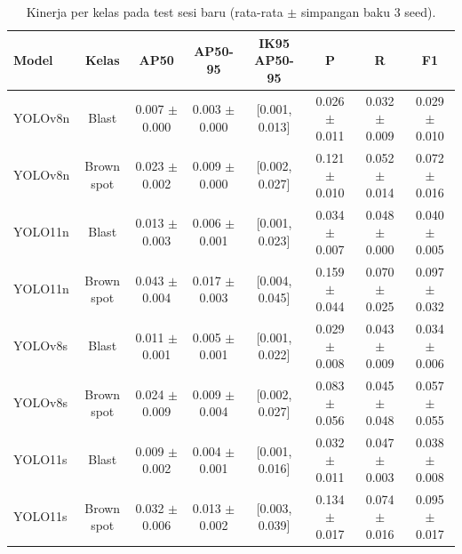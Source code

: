 \begin{table}[!t]
\centering
\caption{Kinerja per kelas pada test sesi baru (rata-rata $\pm$ simpangan baku 3 seed).}
\label{tab:per_kelas_sesi_baru}
\footnotesize
\begin{tabular}{lccccccc}
\hline
\textbf{Model} & \textbf{Kelas} & \textbf{AP50} & \textbf{AP50-95} & \textbf{IK95 AP50-95} & \textbf{P} & \textbf{R} & \textbf{F1} \\
\hline
YOLOv8n & Blast & 0.007 $\pm$ 0.000 & 0.003 $\pm$ 0.000 & [0.001, 0.013] & 0.026 $\pm$ 0.011 & 0.032 $\pm$ 0.009 & 0.029 $\pm$ 0.010 \\
YOLOv8n & Brown spot & 0.023 $\pm$ 0.002 & 0.009 $\pm$ 0.000 & [0.002, 0.027] & 0.121 $\pm$ 0.010 & 0.052 $\pm$ 0.014 & 0.072 $\pm$ 0.016 \\
YOLO11n & Blast & 0.013 $\pm$ 0.003 & 0.006 $\pm$ 0.001 & [0.001, 0.023] & 0.034 $\pm$ 0.007 & 0.048 $\pm$ 0.000 & 0.040 $\pm$ 0.005 \\
YOLO11n & Brown spot & 0.043 $\pm$ 0.004 & 0.017 $\pm$ 0.003 & [0.004, 0.045] & 0.159 $\pm$ 0.044 & 0.070 $\pm$ 0.025 & 0.097 $\pm$ 0.032 \\
YOLOv8s & Blast & 0.011 $\pm$ 0.001 & 0.005 $\pm$ 0.001 & [0.001, 0.022] & 0.029 $\pm$ 0.008 & 0.043 $\pm$ 0.009 & 0.034 $\pm$ 0.006 \\
YOLOv8s & Brown spot & 0.024 $\pm$ 0.009 & 0.009 $\pm$ 0.004 & [0.002, 0.027] & 0.083 $\pm$ 0.056 & 0.045 $\pm$ 0.048 & 0.057 $\pm$ 0.055 \\
YOLO11s & Blast & 0.009 $\pm$ 0.002 & 0.004 $\pm$ 0.001 & [0.001, 0.016] & 0.032 $\pm$ 0.011 & 0.047 $\pm$ 0.003 & 0.038 $\pm$ 0.008 \\
YOLO11s & Brown spot & 0.032 $\pm$ 0.006 & 0.013 $\pm$ 0.002 & [0.003, 0.039] & 0.134 $\pm$ 0.017 & 0.074 $\pm$ 0.016 & 0.095 $\pm$ 0.017 \\
\hline
\end{tabular}
\end{table}
